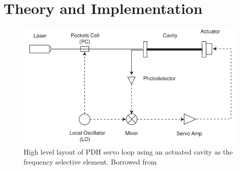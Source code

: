 \newpage
\section{Theory and Implementation}

\begin{figure}[!hrt]
  \centering
  \label{cavity_eom_pdh}
  \includegraphics[scale=0.5]{cavity_eom_pdh.png}
  \caption{High level layout of PDH servo loop using an actuated cavity as
  the frequency selective element. Borrowed from \cite{black1998}}
\end{figure}